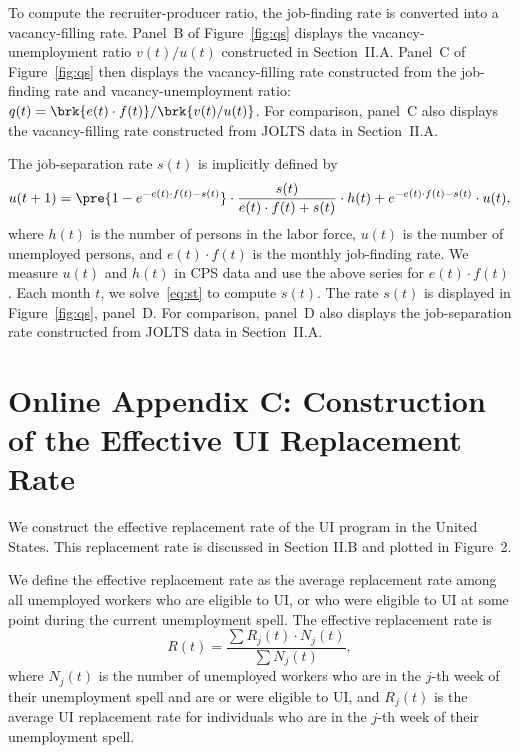 \documentclass[letterpaper,12pt,leqno]{article}
\begin{document}
To compute the recruiter-producer ratio, the job-finding rate is converted into a vacancy-filling rate. Panel~B of Figure~\ref{fig:qs} displays the vacancy-unemployment ratio $v(t)/u(t)$ constructed in Section~II.A. Panel~C of Figure~\ref{fig:qs} then displays the vacancy-filling rate constructed from the job-finding rate and vacancy-unemployment ratio: $q(t)=\brk{e(t)\cdot f(t)}/\brk{v(t)/u(t)}$. For comparison, panel~C also displays the vacancy-filling rate constructed from JOLTS data in Section~II.A. 

The job-separation rate $s(t)$ is implicitly defined by
\begin{equation}
u(t+1) = \pre{1-e^{-e(t)\cdot f(t)-s(t)}}\cdot \frac{s(t)}{e(t)\cdot f(t)+s(t)}\cdot h(t) + e^{-e(t)\cdot f(t)-s(t)}\cdot u(t),
\label{eq:st}\end{equation}
where $h(t)$ is the number of persons in the labor force, $u(t)$ is the number of unemployed persons, and $e(t)\cdot f(t)$ is the monthly job-finding rate. We measure $u(t)$ and $h(t)$ in CPS data and use the above series for $e(t)\cdot f(t)$. Each month $t$, we solve~\eqref{eq:st} to compute $s(t)$. The rate $s(t)$ is displayed in Figure~\ref{fig:qs}, panel~D. For comparison, panel~D also displays the job-separation rate constructed from JOLTS data in Section~II.A.


\section{Online Appendix C: Construction of the Effective UI Replacement Rate}\label{app:replacement}

We construct the effective replacement rate of the UI program in the United States. This replacement rate is discussed in Section II.B and plotted in Figure~2.

We define the effective replacement rate as the average replacement rate among all unemployed workers who are eligible to UI, or who were eligible to UI at some point during the current unemployment spell. The effective replacement rate is
\begin{equation}
R(t) = \frac{\sum R_j(t) \cdot N_j(t)}{\sum N_j(t)},
\label{eq:effective}\end{equation}
where $N_j(t)$ is the number of unemployed workers who are in the $j$-th week of their unemployment spell and are or were eligible to UI, and $R_j(t)$ is the average UI replacement rate for individuals who are in the $j$-th week of their unemployment spell. 
\end{document}
